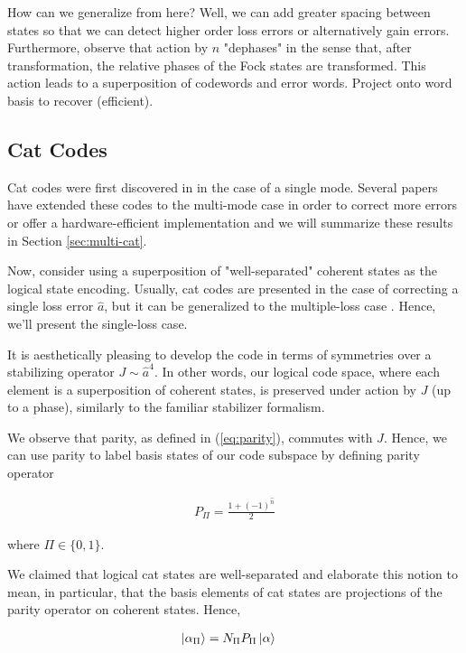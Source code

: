 \documentclass[12]{amsart}
\newcommand\0{\mathbf{0}}
\newcommand\<{\langle}
\renewcommand\>{\rangle}
\begin{document}
How can we generalize from here? Well, we can add greater spacing between states so that we can detect higher order loss errors or alternatively gain errors. Furthermore, observe that action by $n$ "dephases" in the sense that, after transformation, the relative phases of the Fock states are transformed. This action leads to a superposition of codewords and error words. Project onto word basis to recover (efficient).

\subsection{Cat Codes}

Cat codes were first discovered in \cite{cochrane1999macroscopically} in the case of a single mode. Several papers have extended these codes to the multi-mode case in order to correct more errors or offer a hardware-efficient implementation \cite{albert2018multimode, leghtas2013hardware, mirrahimi2014dynamically} and we will summarize these results in Section \ref{sec:multi-cat}.

Now, consider using a superposition of "well-separated" coherent states as the logical state encoding. Usually, cat codes are presented in the case of correcting a single loss error $\hat{a}$, but it can be generalized to the multiple-loss case \cite{albert2018multimode}. Hence, we'll present the single-loss case.

It is aesthetically pleasing to develop the code in terms of symmetries over a stabilizing operator $J \sim \hat{a}^4$. In other words, our logical code space, where each element is a superposition of coherent states, is preserved under action by $J$ (up to a phase), similarly to the familiar stabilizer formalism.

We observe that parity, as defined in (\ref{eq:parity}), commutes with $J$. Hence, we can use parity to label basis states of our code subspace by defining parity operator

\begin{align*}
P_{\Pi} = \frac{1+(-1)^{\hat{n}}}{2}	
\end{align*}

where $\Pi \in \{0, 1\}$.

We claimed that logical cat states are well-separated and elaborate this notion to mean, in particular, that the basis elements of cat states are projections of the parity operator on coherent states. Hence,

\begin{align*}
\ket{\alpha_\Pi} &= N_\Pi P_\Pi \ket{\alpha}
\end{align*}
\end{document}
